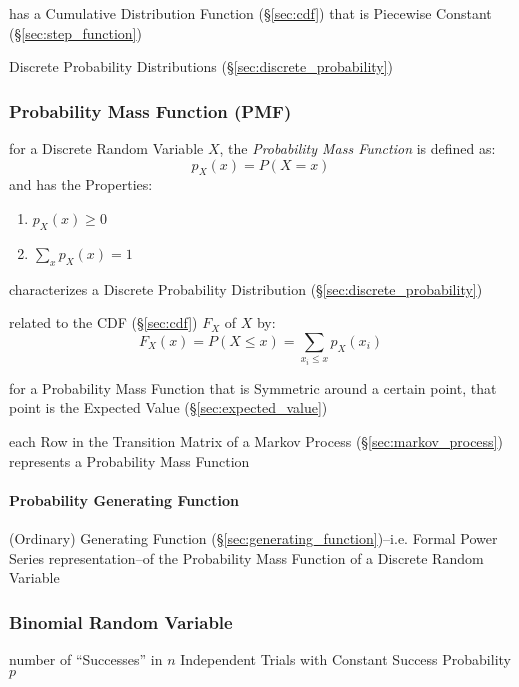 has a Cumulative Distribution Function (\S\ref{sec:cdf}) that is Piecewise
Constant (\S\ref{sec:step_function})

\fist Discrete Probability Distributions (\S\ref{sec:discrete_probability})



\subsubsection{Probability Mass Function (PMF)}\label{sec:pmf}

for a Discrete Random Variable $X$, the \emph{Probability Mass Function} is
defined as:
\[
  p_X(x) = P(X = x)
\]
and has the Properties:
\begin{enumerate}
  \item $p_X(x) \geq 0$
  \item $\sum_x p_X(x) = 1$
\end{enumerate}

characterizes a Discrete Probability Distribution
(\S\ref{sec:discrete_probability})

related to the CDF (\S\ref{sec:cdf}) $F_X$ of $X$ by:
\[
  F_X(x) = P(X \leq x) = \sum_{x_i \leq x} p_X(x_i)
\]

for a Probability Mass Function that is Symmetric around a certain point, that
point is the Expected Value (\S\ref{sec:expected_value})

\fist each Row in the Transition Matrix of a Markov Process
(\S\ref{sec:markov_process}) represents a Probability Mass Function



\paragraph{Probability Generating Function}
\label{sec:probability_generating_function}\hfill

(Ordinary) Generating Function (\S\ref{sec:generating_function})--i.e. Formal
Power Series representation--of the Probability Mass Function of a Discrete
Random Variable



\subsubsection{Binomial Random Variable}\label{sec:binomial_variable}

number of ``Successes'' in $n$ Independent Trials with Constant Success
Probability $p$

